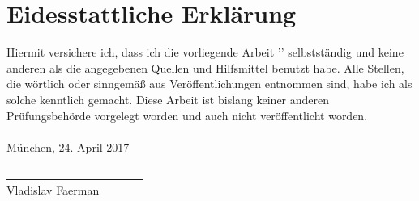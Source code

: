\chapter*{Eidesstattliche Erklärung}

 
Hiermit versichere ich, dass ich die vorliegende Arbeit '\themaT' selbstständig und keine anderen als die angegebenen Quellen und Hilfsmittel benutzt habe. Alle Stellen, die wörtlich oder sinngemäß aus Veröffentlichungen entnommen sind, habe ich als solche kenntlich gemacht. Diese Arbeit ist bislang keiner anderen Prüfungsbehörde vorgelegt worden und auch nicht veröffentlicht worden.
\\\\München, 24. April 2017

\vskip 1.5cm

\underline{~~~~~~~~~~~~~~~~~~~~~~~~}\\
Vladislav Faerman\\